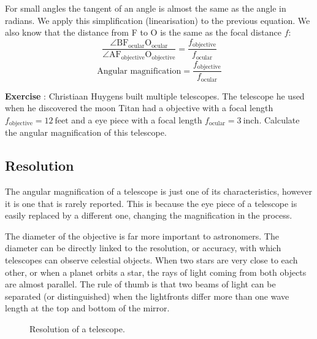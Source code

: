 For small angles the tangent of an angle is almost the same as the angle in radians. We apply this simplification (linearisation) to the previous equation. We also know that the distance from F to O is the same as the focal distance $f$:
\begin{equation}
\frac{\angle \mbox{BF}_{\mbox{ocular}} \mbox{O}_{\mbox{ocular}} }{\angle \mbox{AF}_{\mbox{objective}} \mbox{O}_{\mbox{objective}} } = \frac{f_{\mbox{objective}}}{f_{\mbox{ocular}}}
\end{equation}
\begin{equation} \mbox{Angular magnification} = \frac{f_{\mbox{objective}}}{f_{\mbox{ocular}}} \end{equation}

\begin{shaded}
\textbf{Exercise \theExercise {}} : Christiaan Huygens built multiple telescopes. The telescope he used when he discovered the moon Titan had a objective with a focal length $f_{\mbox{objective}}=12~\mbox{feet}$ and a eye piece with a focal length $f_{\mbox{ocular}}=3~\mbox{inch}$. Calculate the angular magnification of this telescope.\end{shaded}

\subsection{Resolution}
The angular magnification of a telescope is just one of its characteristics, however it is one that is rarely reported. This is because the eye piece of a telescope is easily replaced by a different one, changing the magnification in the process.

The diameter of the objective is far more important to astronomers. The diameter can be directly linked to the resolution, or accuracy, with which telescopes can observe celestial objects. When two stars are very close to each other, or when a planet orbits a star, the rays of light coming from both objects are almost parallel. The rule of thumb is that two beams of light can be separated (or distinguished) when the lightfronts differ more than one wave length at the top and bottom of the mirror.

\begin{figure}\begin{center}
\setlength{\unitlength}{1mm}
\caption{Resolution of a telescope.}\label{fig:tel_res}
\end{center}\end{figure}

